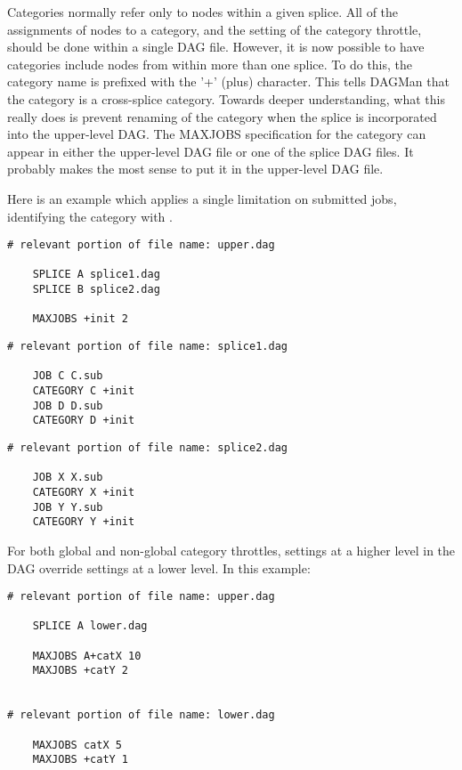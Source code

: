 Categories normally refer only to nodes within a
given splice.
All of the assignments of nodes to a category, and the
setting of the category throttle, should be done within a single DAG file.
However, it is now possible to have categories include nodes
from within more than one splice.
To do this, the category name is prefixed with the '+' (plus) character.
This tells DAGMan that the category is
a cross-splice category.
Towards deeper understanding,
what this really does is prevent renaming
of the category when the splice is incorporated into the upper-level DAG.
The MAXJOBS specification for the category can appear in either the
upper-level DAG file or one of the splice DAG files.
It probably
makes the most sense to put it in the upper-level DAG file.

Here is an example which applies a single limitation on submitted jobs,
identifying the category with . 

\begin{verbatim}
# relevant portion of file name: upper.dag

    SPLICE A splice1.dag
    SPLICE B splice2.dag

    MAXJOBS +init 2
\end{verbatim}

\begin{verbatim}
# relevant portion of file name: splice1.dag

    JOB C C.sub
    CATEGORY C +init
    JOB D D.sub
    CATEGORY D +init

\end{verbatim}

\begin{verbatim}
# relevant portion of file name: splice2.dag

    JOB X X.sub
    CATEGORY X +init
    JOB Y Y.sub
    CATEGORY Y +init

\end{verbatim}

For both global and non-global category throttles, settings at a higher
level in the DAG override settings at a lower level.
In this example:

\begin{verbatim}
# relevant portion of file name: upper.dag

    SPLICE A lower.dag

    MAXJOBS A+catX 10
    MAXJOBS +catY 2


# relevant portion of file name: lower.dag

    MAXJOBS catX 5
    MAXJOBS +catY 1

\end{verbatim}

